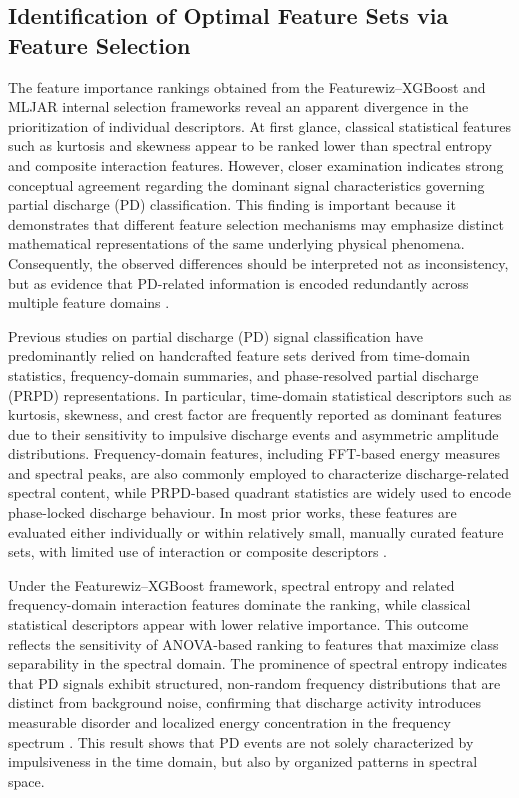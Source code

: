 \subsection{Identification of Optimal Feature Sets via Feature Selection}

The feature importance rankings obtained from the Featurewiz--XGBoost and MLJAR internal selection frameworks reveal an apparent divergence in the prioritization of individual descriptors. At first glance, classical statistical features such as kurtosis and skewness appear to be ranked lower than spectral entropy and composite interaction features. However, closer examination indicates strong conceptual agreement regarding the dominant signal characteristics governing partial discharge (PD) classification. This finding is important because it demonstrates that different feature selection mechanisms may emphasize distinct mathematical representations of the same underlying physical phenomena. Consequently, the observed differences should be interpreted not as inconsistency, but as evidence that PD-related information is encoded redundantly across multiple feature domains \parencite{Yao_2020_1, Du_2023}.

Previous studies on partial discharge (PD) signal classification have predominantly relied on handcrafted feature sets derived from time-domain statistics, frequency-domain summaries, and phase-resolved partial discharge (PRPD) representations. In particular, time-domain statistical descriptors such as kurtosis, skewness, and crest factor are frequently reported as dominant features due to their sensitivity to impulsive discharge events and asymmetric amplitude distributions. Frequency-domain features, including FFT-based energy measures and spectral peaks, are also commonly employed to characterize discharge-related spectral content, while PRPD-based quadrant statistics are widely used to encode phase-locked discharge behaviour. In most prior works, these features are evaluated either individually or within relatively small, manually curated feature sets, with limited use of interaction or composite descriptors \parencite{Auni_2020, Soh_2022}.

Under the Featurewiz--XGBoost framework, spectral entropy and related frequency-domain interaction features dominate the ranking, while classical statistical descriptors appear with lower relative importance. This outcome reflects the sensitivity of ANOVA-based ranking to features that maximize class separability in the spectral domain. The prominence of spectral entropy indicates that PD signals exhibit structured, non-random frequency distributions that are distinct from background noise, confirming that discharge activity introduces measurable disorder and localized energy concentration in the frequency spectrum \parencite{Sun_2020, Romphuchaiyapruek_2025}. This result shows that PD events are not solely characterized by impulsiveness in the time domain, but also by organized patterns in spectral space.


